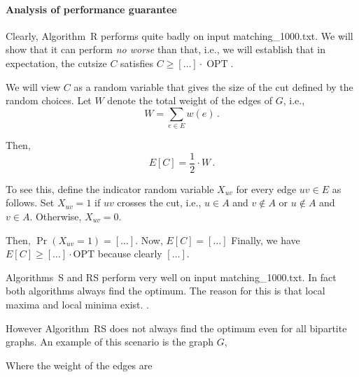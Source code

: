 \documentclass{tufte-handout}
\begin{document}
\paragraph{Analysis of performance guarantee}

Clearly, Algorithm~R performs quite badly on input 
  matching\_1000.txt.
We will show that it can perform \emph{no worse} than that, i.e., we
will establish that in expectation, the cutsize $C$ satisfies $C \geq
[\ldots]\cdot \operatorname{OPT}$.


We will view $C$ as a random variable that gives the size of the cut
defined by the random choices.
Let $W$ denote the total weight of the edges of $G$, i.e.,
\[ W= \sum_{e\in E} w(e)\,.\]

Then,
\begin{equation}\label{eq: E[C]}
E[C] = \textstyle\frac{1}{2}\cdot W\,.
\end{equation}

To see this, define the indicator random variable $X_{uv}$ for every
edge $uv\in E$ as follows.
Set $X_{uv}=1$ if $uv$ crosses the cut, i.e., $u\in A$ and $v\notin A$
or $u\notin A$ and $v\in A$.
Otherwise, $X_{uv} = 0$.

Then, $\Pr(X_{uv} = 1) = [\ldots]$.
Now, $E[C]=[\ldots]$ Finally, we have 
\(E[C]\geq [\ldots]\cdot \text{OPT}\) because clearly
$[\ldots]$.

\bigskip
Algorithms~S and RS perform very well on input matching\_1000.txt. In fact
both algorithms always find the optimum. The reason for this is that local maxima and local minima exist.
.

However Algorithm~RS does not always find the optimum even for all bipartite graphs. 
An example of this scenario is the graph $G$,

\bigskip

Where the weight of the edges are
\end{document}
